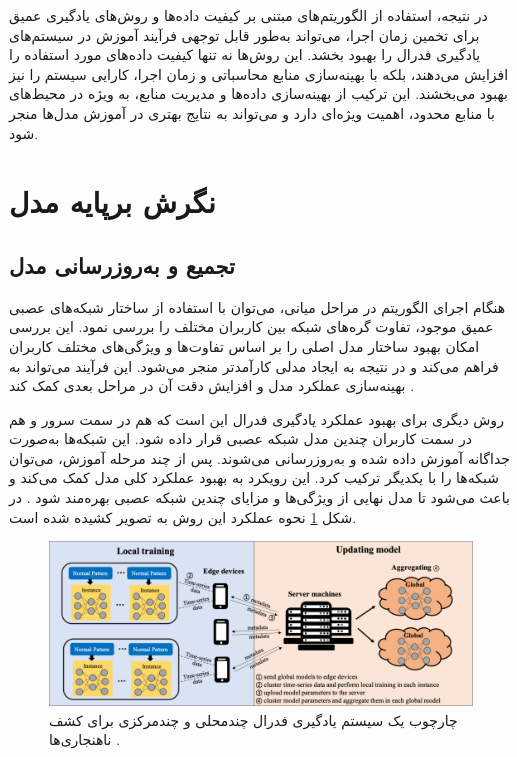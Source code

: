 در نتیجه، استفاده از الگوریتم‌های مبتنی بر کیفیت داده‌ها و روش‌های یادگیری عمیق برای تخمین زمان اجرا، می‌تواند به‌طور قابل توجهی فرآیند آموزش در سیستم‌های یادگیری فدرال را بهبود بخشد. این روش‌ها نه تنها کیفیت داده‌های مورد استفاده را افزایش می‌دهند، بلکه با بهینه‌سازی منابع محاسباتی و زمان اجرا، کارایی سیستم را نیز بهبود می‌بخشند. این ترکیب از بهینه‌سازی داده‌ها و مدیریت منابع، به ویژه در محیط‌های با منابع محدود، اهمیت ویژه‌ای دارد و می‌تواند به نتایج بهتری در آموزش مدل‌ها منجر شود.


\section{نگرش برپایه مدل}
\subsection{
	تجمیع و به‌روزرسانی مدل%
}	
هنگام اجرای الگوریتم در مراحل میانی، می‌توان با استفاده از ساختار شبکه‌های عصبی عمیق موجود، تفاوت گره‌های شبکه بین کاربران مختلف را بررسی نمود. این بررسی امکان بهبود ساختار مدل اصلی را بر اساس تفاوت‌ها و ویژگی‌های مختلف کاربران فراهم می‌کند و در نتیجه به ایجاد مدلی کارآمدتر منجر می‌شود. این فرآیند می‌تواند به بهینه‌سازی عملکرد مدل و افزایش دقت آن در مراحل بعدی کمک کند
\cite{sannara2021federated}.

روش دیگری برای بهبود عملکرد یادگیری فدرال این است که هم در سمت سرور و هم در سمت کاربران چندین مدل شبکه عصبی قرار داده شود. این شبکه‌ها به‌صورت جداگانه آموزش داده شده و به‌روزرسانی می‌شوند. پس از چند مرحله آموزش، می‌توان شبکه‌ها را با یکدیگر ترکیب کرد. این رویکرد به بهبود عملکرد کلی مدل کمک می‌کند و باعث می‌شود تا مدل نهایی از ویژگی‌ها و مزایای چندین شبکه عصبی بهره‌مند شود
\cite{qin2021mlmg}.
در شکل
\ref{multi_local_and_multi_global}
نحوه عملکرد این روش به تصویر کشیده شده است. 



\begin{figure}[t]
	\centering
	\includegraphics[scale=0.44]{images/chap3/multi_local_and_multi_global.png}%
	\caption{%
		چارچوب یک سیستم یادگیری فدرال چندمحلی و چندمرکزی برای کشف ناهنجاری‌ها 
		\cite{qin2021mlmg}%
		.
	}
	\label{multi_local_and_multi_global}
	\centering
\end{figure}




